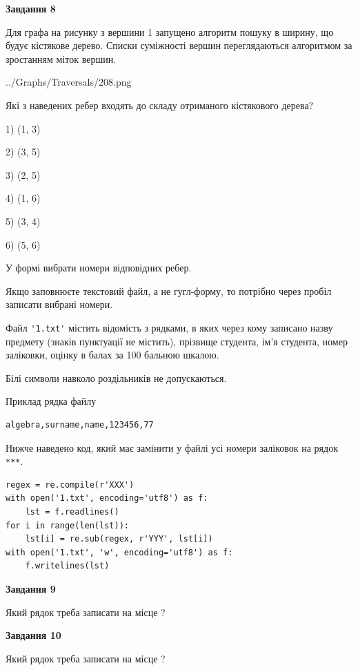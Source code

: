 \documentclass[12pt, ukrainian]{article}
\def\code#1{\Verb!#1!}
\begin{document}
{\begin {large}
{\begin {center}\textbf{Завдання 8}\end {center}}\par
Для графа на рисунку з вершини 1 запущено алгоритм пошуку в ширину, що будує кістякове дерево. Списки суміжності вершин переглядаються алгоритмом за зростанням міток вершин.\par
\begin{center}
	{../Graphs/Traversals/208.png}
\end{center}
\par Які з наведених ребер входять до складу отриманого кістякового дерева?\par
1) (1, 3)\par
2) (3, 5)\par
3) (2, 5)\par
4) (1, 6)\par
5) (3, 4)\par
6) (5, 6)\par
{\vskip 15pt} У формі вибрати номери відповідних ребер.


Якщо заповнюєте текстовий файл, а не гугл-форму, то потрібно через пробіл записа\-ти вибрані номери.\par
\newpage


Файл \code{'1.txt'} містить відомість з рядками, в яких через кому записа\-но назву предмету (знаків пунктуації не містить), прізвище студента, ім'я студента, номер залі\-ков\-ки, оцінку в балах за 100 бальною шкалою.

Білі символи навколо роздільників не допускаються.

Приклад рядка файлу



\begin{verbatim}
algebra,surname,name,123456,77
\end{verbatim}


Нижче наведено код, який має замінити у файлі усі номери заліковок на рядок \code{***}.



\begin{verbatim}
regex = re.compile(r'XXX')
with open('1.txt', encoding='utf8') as f:
    lst = f.readlines()
for i in range(len(lst)):
    lst[i] = re.sub(regex, r'YYY', lst[i])
with open('1.txt', 'w', encoding='utf8') as f:
    f.writelines(lst)
\end{verbatim}




{\begin {center}\textbf{Завдання 9}\end {center}}\par
Який рядок треба записати на місце  ?\par
\vspace{5mm}


{\begin {center}\textbf{Завдання 10}\end {center}}\par
Який рядок треба записати на місце  ?\par


\newpage


\end {large}}
\end{document}
